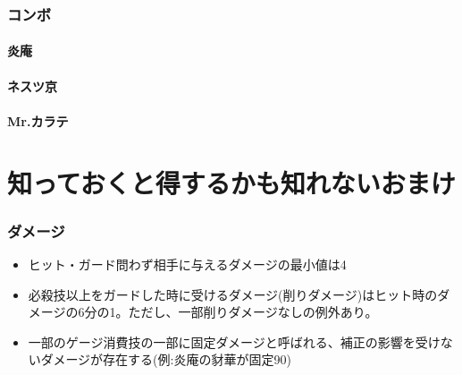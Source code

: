 \documentclass[a4j,11pt]{jarticle}
\begin{document}
\section{コンボ}
\subsection{炎庵}
\subsection{ネスツ京}
\subsection{Mr.カラテ}

\part{知っておくと得するかも知れないおまけ}
\section{ダメージ}
\begin{itemize}
  \item ヒット・ガード問わず相手に与えるダメージの最小値は4
  \item 必殺技以上をガードした時に受けるダメージ(削りダメージ)はヒット時のダメージの6分の1。ただし、一部削りダメージなしの例外あり。
  \item 一部のゲージ消費技の一部に固定ダメージと呼ばれる、補正の影響を受けないダメージが存在する(例:炎庵の豺華が固定90)
\end{itemize}
\end{document}
